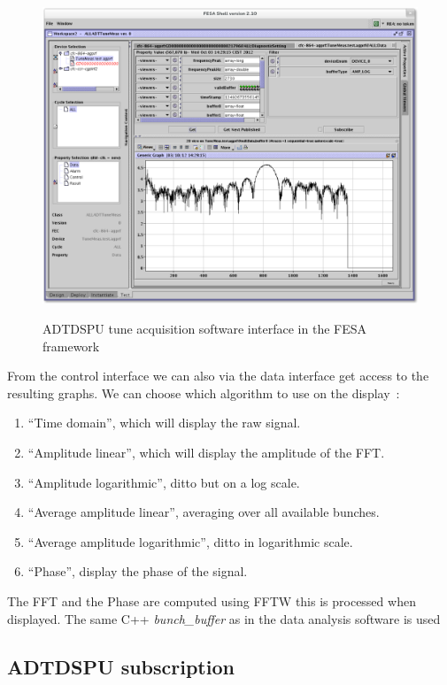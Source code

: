 \begin{figure}[H]
\caption{ADTDSPU tune acquisition software interface in the FESA framework}
\centering
\includegraphics[scale=0.25]{amplitude_log.pdf}
\label{fig:tuneacq}
\end{figure}

From the control interface we can also via the data interface get access to the resulting graphs. We can choose which algorithm to use on the display~:

\begin{enumerate}
\item ``Time domain'', which will display the raw signal.
\item ``Amplitude linear'', which will display the amplitude of the FFT.
\item ``Amplitude logarithmic'', ditto but on a log scale.
\item ``Average amplitude linear'', averaging over all available bunches.
\item ``Average amplitude logarithmic'', ditto in logarithmic scale.
\item ``Phase'', display the phase of the signal.
\end{enumerate}

The FFT and the Phase are computed using FFTW this is processed when displayed. The same C++ \emph{bunch\_buffer} as in the data analysis software is used

\subsection{ADTDSPU subscription}

